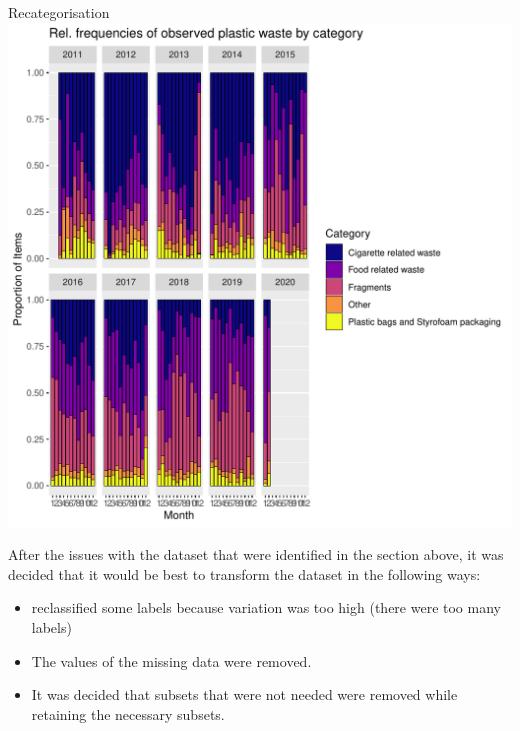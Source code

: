 \documentclass[10pt]{article}\usepackage[]{graphicx}\usepackage[]{color}
\makeatletter
\def\maxwidth{ %
  \ifdim\Gin@nat@width>\linewidth
    \linewidth
  \else
    \Gin@nat@width
  \fi
}
\newenvironment{kframe}{%
 \def\at@end@of@kframe{}%
 \ifinner\ifhmode%
  \def\at@end@of@kframe{\end{minipage}}%
  \begin{minipage}{\columnwidth}%
 \fi\fi%
 \def\FrameCommand##1{\hskip\@totalleftmargin \hskip-\fboxsep
 \colorbox{shadecolor}{##1}\hskip-\fboxsep
     \hskip-\linewidth \hskip-\@totalleftmargin \hskip\columnwidth}%
 \MakeFramed {\advance\hsize-\width
   \@totalleftmargin\z@ \linewidth\hsize
   \@setminipage}}%
 {\par\unskip\endMakeFramed%
 \at@end@of@kframe}
\newenvironment{knitrout}{}{} %
\makeatother
\begin{document}
\begin{itemize}
\begin{knitrout}
\begin{kframe}
{\ttfamily\noindent\itshape\color{messagecolor}{\#\# Saving 7 x 7 in image}}

{\ttfamily\noindent{}}

{\ttfamily\noindent{}}

{\ttfamily\noindent\bfseries{}}\end{kframe}
\end{knitrout}

Recategorisation
\begin{knitrout}
\color{fgcolor}
\includegraphics[width=\maxwidth]{figure/unnamed-chunk-23-1} 

\end{knitrout}


After the issues with the dataset that were identified in the section above, it was decided that it would be best to transform the dataset in the following ways:
\begin{itemize}
\item reclassified some labels because variation was too high (there were too many labels)
\item The values of the missing data were removed.
\item It was decided that subsets that were not needed were removed while retaining the necessary subsets.


\end{itemize}
\end{itemize}
\end{document}
